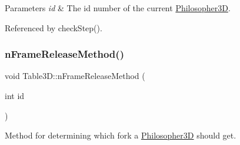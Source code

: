 \begin{DoxyParams}{Parameters}
{\em id} & The id number of the current \hyperlink{class_philosopher3_d}{Philosopher3D}. \\
\hline
\end{DoxyParams}


Referenced by check\+Step().

\mbox{\label{class_table3_d_a3f4c3035efbd707eb34ca3eef4e71340}} 
\subsubsection{\texorpdfstring{n\+Frame\+Release\+Method()}{nFrameReleaseMethod()}}
{\footnotesize\ttfamily void Table3\+D\+::n\+Frame\+Release\+Method (\begin{DoxyParamCaption}\item[{int}]{id }\end{DoxyParamCaption})}



Method for determining which fork a \hyperlink{class_philosopher3_d}{Philosopher3D} should get. 


